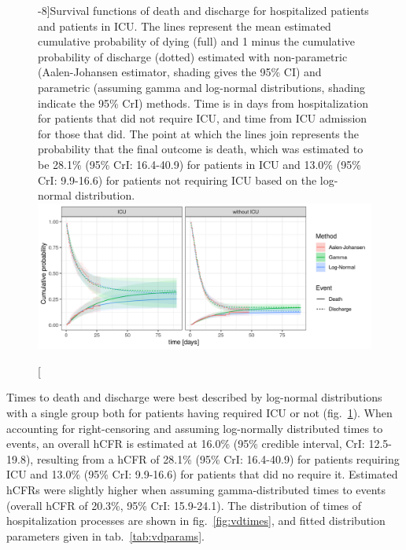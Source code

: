 \begin{figure}[!htb]
    \centering
        \caption[Survival functions of death and discharge for hospitalized patients and patients in ICU][-8\baselineskip]{Survival functions of death and discharge for hospitalized patients and patients in ICU. The lines represent the mean estimated cumulative probability of dying (full) and 1 minus the cumulative probability of discharge (dotted) estimated with non-parametric (Aalen-Johansen estimator, shading gives the 95\% CI) and parametric (assuming gamma and log-normal distributions, shading indicate the 95\% CrI) methods. Time is in days from hospitalization for patients that did not require ICU, and time from ICU admission for those that did. The point at which the lines join represents the probability that the final outcome is death, which was estimated to be 28.1\% (95\% CrI: 16.4-40.9) for patients in ICU and 13.0\% (95\% CrI: 9.9-16.6) for patients not requiring ICU based on the log-normal distribution.}
    \includegraphics{fig_covid-switzerland-npi/fig_supp/survival_analaysis.png}
    \label{fig:delays}
\end{figure}


Times to death and discharge were best described by log-normal distributions with a single group both for patients having required ICU or not (fig.~\ref{fig:delays}). When accounting for right-censoring and assuming log-normally distributed times to events, an overall hCFR is estimated at 16.0\% (95\% credible interval, CrI: 12.5-19.8), resulting from a hCFR of 28.1\% (95\% CrI: 16.4-40.9) for patients requiring ICU and 13.0\% (95\% CrI: 9.9-16.6) for patients that did no require it. Estimated hCFRs were slightly higher when assuming gamma-distributed times to events (overall hCFR of 20.3\%, 95\% CrI: 15.9-24.1). The distribution of times of hospitalization processes are shown in fig.~\ref{fig:vdtimes}, and fitted distribution parameters given in tab.~\ref{tab:vdparams}.

